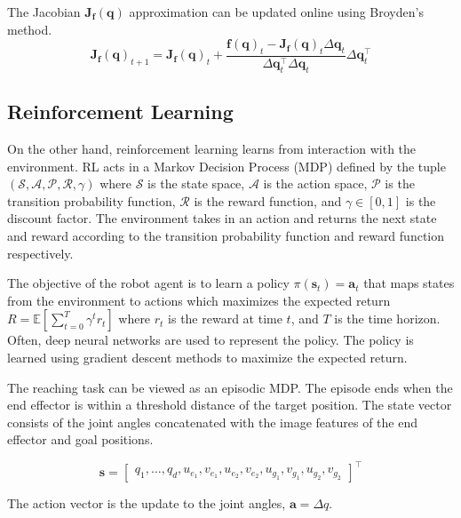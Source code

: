 \documentclass[letterpaper, 10 pt, conference]{ieeeconf}  %
\begin{document}
The Jacobian $\mathbf{J}_{\mathbf{f}}(\mathbf{q})$ approximation can be updated online
using Broyden's method.
\begin{equation}
    \mathbf{J}_{\mathbf{f}}(\mathbf{q})_{t+1} = \mathbf{J}_{\mathbf{f}}(\mathbf{q})_t + \frac{\mathbf{f}(\mathbf{q})_t - \mathbf{J}_{\mathbf{f}}(\mathbf{q})_t \Delta \mathbf{q}_t}{\Delta \mathbf{q}_t^\top \Delta \mathbf{q}_t} \Delta \mathbf{q}_t^\top
\end{equation}

\subsection{Reinforcement Learning}

On the other hand, reinforcement learning learns from interaction with
the environment. RL acts in a Markov Decision Process (MDP) defined by the tuple
$(\mathcal{S}, \mathcal{A}, \mathcal{P}, \mathcal{R}, \gamma)$ where $\mathcal{S}$ is
the state space, $\mathcal{A}$ is the action space, $\mathcal{P}$ is the transition
probability function, $\mathcal{R}$ is the reward function, and $\gamma \in [0, 1]$ is the discount
factor. The environment takes in an action and returns the next state and reward
according to the transition probability function and reward function respectively.

The objective of the robot agent is to learn a policy $\pi(\mathbf{s}_t) =
\mathbf{a}_t$ that maps states from the environment to actions which maximizes
the expected return $R = \mathbb{E}[\sum_{t=0}^T \gamma^t r_t]$ where $r_t$ is
the reward at time $t$, and $T$ is the time horizon. Often, deep neural networks are used to represent the policy.
The policy is learned using gradient descent methods to maximize the expected
return.

The reaching task can be viewed as an episodic MDP. The episode ends when the end
effector is within a threshold distance of the target position. The state vector
consists of the joint angles concatenated with the image features of the end effector
and goal positions.

\begin{equation}
    \mathbf{s} = \begin{bmatrix}q_1, \ldots, q_d, u_{e_1}, v_{e_1}, u_{e_2}, v_{e_2}, u_{g_1}, v_{g_1}, u_{g_2}, v_{g_2}\end{bmatrix}^\top
\end{equation}

The action vector is the update to the joint angles, $\mathbf{a} = \Delta q$.
\end{document}
